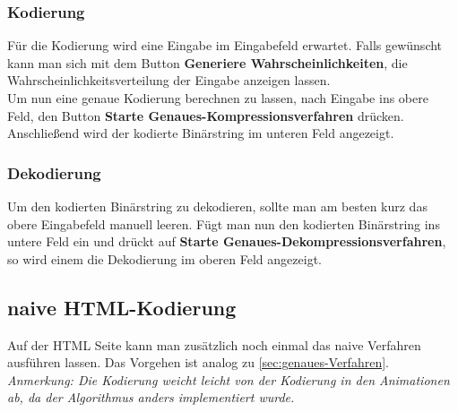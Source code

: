 \documentclass[a4paper]{article}
\theoremstyle{definition}
\theoremstyle{remark}
\begin{document}
\subsubsection{Kodierung}
Für die Kodierung wird eine Eingabe im Eingabefeld erwartet. Falls gewünscht kann man sich mit dem Button \textbf{Generiere Wahrscheinlichkeiten}, die Wahrscheinlichkeitsverteilung der Eingabe anzeigen lassen.
\\
Um nun eine genaue Kodierung berechnen zu lassen, nach Eingabe ins obere Feld, den Button \textbf{Starte Genaues-Kompressionsverfahren} drücken.
\\
Anschließend wird der kodierte Binärstring im unteren Feld angezeigt.\\

\subsubsection{Dekodierung}
Um den kodierten Binärstring zu dekodieren, sollte man am besten kurz das obere Eingabefeld manuell leeren. Fügt man nun den kodierten Binärstring ins untere Feld ein und drückt auf \textbf{Starte Genaues-Dekompressionsverfahren}, so wird einem die Dekodierung im oberen Feld angezeigt.


\subsection{naive HTML-Kodierung}
Auf der HTML Seite kann man zusätzlich noch einmal das naive Verfahren ausführen lassen. Das Vorgehen ist analog zu \ref{sec:genaues-Verfahren}.\\
\textit{Anmerkung: Die Kodierung weicht leicht von der Kodierung in den Animationen ab, da der Algorithmus anders implementiert wurde.}


	
	
	

		
		\newpage
	
\end{document}
